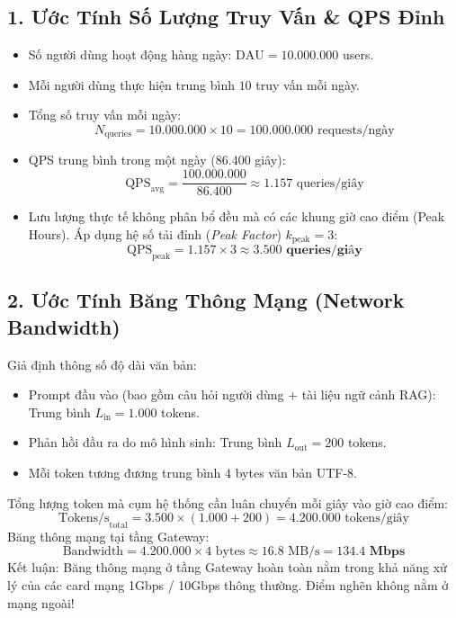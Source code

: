 \subsection{1. Ước Tính Số Lượng Truy Vấn \& QPS Đỉnh}
\begin{itemize}
  \item Số người dùng hoạt động hàng ngày: $\text{DAU} = 10.000.000$ users.
  \item Mỗi người dùng thực hiện trung bình $10$ truy vấn mỗi ngày.
  \item Tổng số truy vấn mỗi ngày:
  \begin{equation}
  N_{\text{queries}} = 10.000.000 \times 10 = 100.000.000 \text{ requests/ngày}
  \end{equation}
  \item QPS trung bình trong một ngày ($86.400$ giây):
  \begin{equation}
  \text{QPS}_{\text{avg}} = \frac{100.000.000}{86.400} \approx 1.157 \text{ queries/giây}
  \end{equation}
  \item Lưu lượng thực tế không phân bổ đều mà có các khung giờ cao điểm (Peak Hours). Áp dụng hệ số tải đỉnh (\textit{Peak Factor}) $k_{\text{peak}} = 3$:
  \begin{equation}
  \text{QPS}_{\text{peak}} = 1.157 \times 3 \approx \mathbf{3.500 \text{ queries/giây}}
  \end{equation}
\end{itemize}

\subsection{2. Ước Tính Băng Thông Mạng (Network Bandwidth)}
Giả định thông số độ dài văn bản:
\begin{itemize}
  \item Prompt đầu vào (bao gồm câu hỏi người dùng + tài liệu ngữ cảnh RAG): Trung bình $L_{\text{in}} = 1.000$ tokens.
  \item Phản hồi đầu ra do mô hình sinh: Trung bình $L_{\text{out}} = 200$ tokens.
  \item Mỗi token tương đương trung bình $4$ bytes văn bản UTF-8.
\end{itemize}
Tổng lượng token mà cụm hệ thống cần luân chuyển mỗi giây vào giờ cao điểm:
\begin{equation}
\text{Tokens/s}_{\text{total}} = 3.500 \times (1.000 + 200) = 4.200.000 \text{ tokens/giây}
\end{equation}
Băng thông mạng tại tầng Gateway:
\begin{equation}
\text{Bandwidth} = 4.200.000 \times 4 \text{ bytes} \approx 16.8 \text{ MB/s} = \mathbf{134.4 \text{ Mbps}}
\end{equation}
Kết luận: Băng thông mạng ở tầng Gateway hoàn toàn nằm trong khả năng xử lý của các card mạng 1Gbps / 10Gbps thông thường. Điểm nghẽn không nằm ở mạng ngoài!

